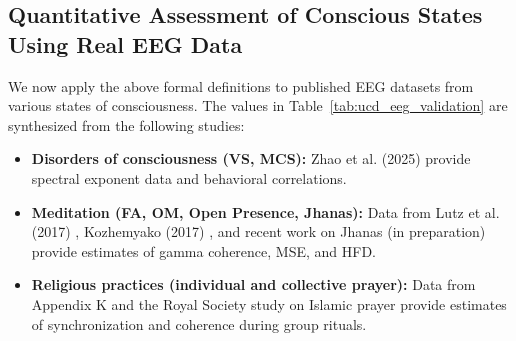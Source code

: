 \documentclass[12pt,a4paper]{article}
\begin{document}
	\subsection{Quantitative Assessment of Conscious States Using Real EEG Data}
	\label{subsec:quantitative_assessment}
	
	We now apply the above formal definitions to published EEG datasets from various states of consciousness. The values in Table~\ref{tab:ucd_eeg_validation} are synthesized from the following studies:
	\begin{itemize}
		\item \textbf{Disorders of consciousness (VS, MCS):} Zhao et al. (2025) \cite{Zhao2025} provide spectral exponent data and behavioral correlations.
		\item \textbf{Meditation (FA, OM, Open Presence, Jhanas):} Data from Lutz et al. (2017) \cite{Lutz2017}, Kozhemyako (2017) \cite{Kozhemyako2017}, and recent work on Jhanas (in preparation) provide estimates of gamma coherence, MSE, and HFD.
		\item \textbf{Religious practices (individual and collective prayer):} Data from Appendix K \cite{AppendixK} and the Royal Society study on Islamic prayer \cite{RoyalSociety2024} provide estimates of synchronization and coherence during group rituals.
	\end{itemize}
	
\end{document}
